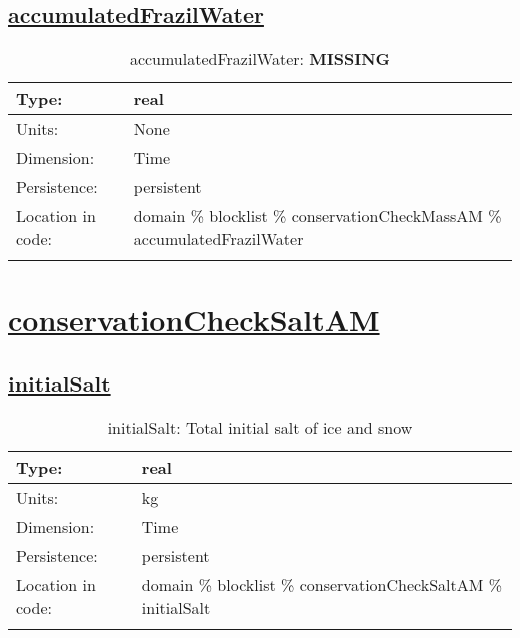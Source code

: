\subsection[accumulatedFrazilWater]{\hyperref[sec:var_tab_conservationCheckMassAM]{accumulatedFrazilWater}}
\label{subsec:var_sec_conservationCheckMassAM_accumulatedFrazilWater}
\begin{center}
\begin{longtable}{| p{2.0in} | p{4.0in} |}
        \hline 
        Type: & real \\
        \hline 
        Units: & \si{None} \\
        \hline 
        Dimension: & Time \\
        \hline 
        Persistence: & persistent \\
        \hline 
         Location in code: & domain \% blocklist \% conservationCheckMassAM \% accumulatedFrazilWater \\
         \hline 
    \caption{accumulatedFrazilWater: {\bf \color{red} MISSING}}
\end{longtable}
\end{center}
\section[conservationCheckSaltAM]{\hyperref[sec:var_tab_conservationCheckSaltAM]{conservationCheckSaltAM}}
\label{sec:var_sec_conservationCheckSaltAM}
\subsection[initialSalt]{\hyperref[sec:var_tab_conservationCheckSaltAM]{initialSalt}}
\label{subsec:var_sec_conservationCheckSaltAM_initialSalt}
\begin{center}
\begin{longtable}{| p{2.0in} | p{4.0in} |}
        \hline 
        Type: & real \\
        \hline 
        Units: & \si{kg} \\
        \hline 
        Dimension: & Time \\
        \hline 
        Persistence: & persistent \\
        \hline 
         Location in code: & domain \% blocklist \% conservationCheckSaltAM \% initialSalt \\
         \hline 
    \caption{initialSalt: Total initial salt of ice and snow}
\end{longtable}
\end{center}
